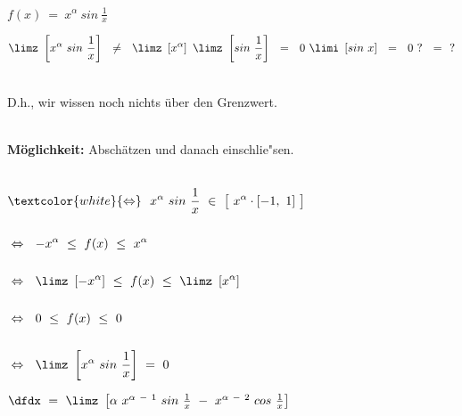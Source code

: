 \begin{description}[leftmargin=*, labelsep=3em, itemsep=3em]
	
	\item[\textnormal{d)}] $f(x) ~ = ~ x^{\alpha} ~ sin ~ \frac{1}{x}$ \hfill \break
	
	\[ \limz ~ \left[ x^{\alpha} ~ sin ~ \frac{1}{x} \right] ~~ \neq ~~ \limz ~ \left[ x^{\alpha} \right] ~ \limz ~ \left[ sin ~ \frac{1}{x} \right] ~~ = ~~ 0 ~ \limi ~ \left[ sin ~ x \right] ~~ = ~~ 0 ~ ? ~~ = ~~ ? \]
	
	~\\D.h., wir wissen noch nichts über den Grenzwert.
	
	~\\
	
	\textbf{Möglichkeit:} \qquad Abschätzen und danach einschlie{"s}en.
	
	~\\
	
	$\begin{aligned}
	&\textcolor{white}{\Leftrightarrow} ~~ x^{\alpha} ~ sin ~ \frac{1}{x} ~ \in ~ \big[ ~ x^{\alpha} \cdot [-1, ~ 1] ~ \big] \\ \\
	&\Leftrightarrow ~~ {-x}^{\alpha} ~ \leq ~ f(x) ~ \leq ~ x^{\alpha} \\ \\
	&\Leftrightarrow ~~ \limz ~ \left[ {-x}^{\alpha} \right] ~ \leq ~ f(x) ~ \leq ~ \limz ~ \left[ x^{\alpha} \right] \\ \\
	&\Leftrightarrow ~~ 0 ~ \leq ~ f(x) ~ \leq ~ 0 \\ \\
	&\Leftrightarrow ~~ \limz ~ \left[ x^{\alpha} ~ sin ~ \frac{1}{x} \right] ~ = ~ 0
	\end{aligned}$
	
	\item[\textnormal{d)}] $\dfdx ~ = ~ \limz ~ \left[ \alpha ~ x^{\alpha ~ - ~ 1} ~ sin ~ \frac{1}{x} ~ - ~ x^{\alpha ~ - ~ 2}  ~ cos ~ \frac{1}{x} \right]$
	
	~\\
	

\end{description}
